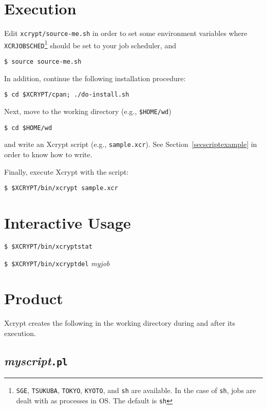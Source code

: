 \documentclass[a4paper,10pt]{report}
\begin{document}
\section{Execution}

Edit \texttt{xcrypt/source-me.sh} in order to set some environment
variables where \texttt{XCRJOBSCHED}\footnote{\texttt{SGE},
\texttt{TSUKUBA}, \texttt{TOKYO}, \texttt{KYOTO}, and \texttt{sh} are
available.  In the case of \texttt{sh}, jobs are dealt with as
processes in OS.  The default is \texttt{sh}} should be set to your
job scheduler, and
\begin{screen}
\texttt{\$ source source-me.sh}
\end{screen}
In addition, continue the following installation procedure:
\begin{screen}
\texttt{\$ cd \$XCRYPT/cpan; ./do-install.sh}
\end{screen}

Next, move to the working directory (e.g., \texttt{\$HOME/wd})
\begin{screen}
\texttt{\$ cd \$HOME/wd}
\end{screen}
and write an Xcrypt script (e.g., \texttt{sample.xcr}).  See
Section~\ref{secscriptexample} in order to know how to write.

Finally, execute Xcrypt with the script:
\begin{screen}
\texttt{\$ \$XCRYPT/bin/xcrypt sample.xcr}
\end{screen}

\section{Interactive Usage}

\begin{screen}
\texttt{\$ \$XCRYPT/bin/xcryptstat}
\end{screen}
\begin{screen}
\texttt{\$ \$XCRYPT/bin/xcryptdel} \textit{myjob}
\end{screen}

\section{Product}\label{sec:created}

Xcrypt creates the following in the working directory
during and after its execution.

\subsection*{\textit{myscript}\texttt{.pl}}
\end{document}
